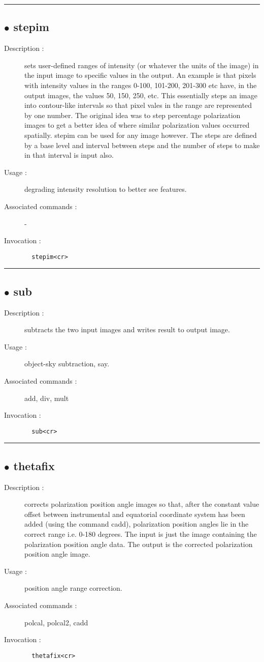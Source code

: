 \hrule \subsection*{$\bullet$ stepim}
\begin{description}
\item[Description :] sets user-defined ranges of intensity (or whatever the units of
the image) in the input image to specific values in the output.  An
example is that pixels with intensity values in the ranges 0-100,
101-200, 201-300 etc have, in the output images, the values 50, 150, 250,
etc.  This essentially steps an image into contour-like intervals so that
pixel vales in the range are represented by one number.  The original
idea was to step percentage polarization images to get a better idea of
where similar polarization values occurred spatially.  stepim can be
used for any image however.  The steps are defined by a base level and
interval between steps and the number of steps to make in that interval
is input also.
\item[Usage :] degrading intensity resolution to better see features.
\item[Associated commands :] -
\item[Invocation :]

\verb+  stepim<cr> +\end{description}

\hrule \subsection*{$\bullet$ sub}
\begin{description}
\item[Description :] subtracts the two input images and writes result to output image.
\item[Usage :] object-sky subtraction, say.
\item[Associated commands :] add, div, mult
\item[Invocation :]

\verb+  sub<cr> +\end{description}

\hrule \subsection*{$\bullet$ thetafix}
\begin{description}
\item[Description :] corrects polarization position angle images so that, after the
constant value offset between instrumental and equatorial coordinate
system has been added (using the command cadd), polarization position
angles lie in the correct range i.e. 0-180 degrees.  The input is just
the image containing the polarization position angle data.  The output is
the corrected polarization position angle image.
\item[Usage :] position angle range correction.
\item[Associated commands :] polcal, polcal2, cadd
\item[Invocation :]

\verb+  thetafix<cr> +\end{description}

